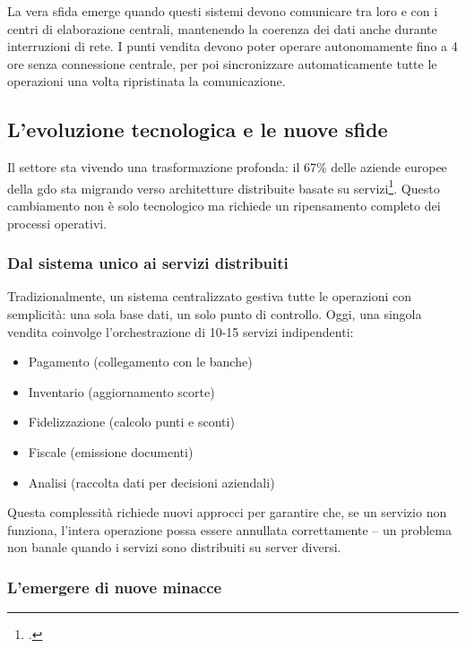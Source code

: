 La vera sfida emerge quando questi sistemi devono comunicare tra loro e con i centri di elaborazione centrali, mantenendo la coerenza dei dati anche durante interruzioni di rete. I punti vendita devono poter operare autonomamente fino a 4 ore senza connessione centrale, per poi sincronizzare automaticamente tutte le operazioni una volta ripristinata la comunicazione.

\subsection{L'evoluzione tecnologica e le nuove sfide}
\label{subsec:evoluzione_sfide}

Il settore sta vivendo una trasformazione profonda: il 67\% delle aziende europee della \gls{gdo} sta migrando verso architetture distribuite basate su servizi\footcite{gartner2024cloud}. Questo cambiamento non è solo tecnologico ma richiede un ripensamento completo dei processi operativi.

\subsubsection{Dal sistema unico ai servizi distribuiti}
\label{subsubsec:servizi_distribuiti}

Tradizionalmente, un sistema centralizzato gestiva tutte le operazioni con semplicità: una sola base dati, un solo punto di controllo. Oggi, una singola vendita coinvolge l'orchestrazione di 10-15 servizi indipendenti:

\begin{itemize}
\item Pagamento (collegamento con le banche)
\item Inventario (aggiornamento scorte)
\item Fidelizzazione (calcolo punti e sconti)
\item Fiscale (emissione documenti)
\item Analisi (raccolta dati per decisioni aziendali)
\end{itemize}

Questa complessità richiede nuovi approcci per garantire che, se un servizio non funziona, l'intera operazione possa essere annullata correttamente – un problema non banale quando i servizi sono distribuiti su server diversi.

\subsubsection{L'emergere di nuove minacce}
\label{subsubsec:nuove_minacce}

